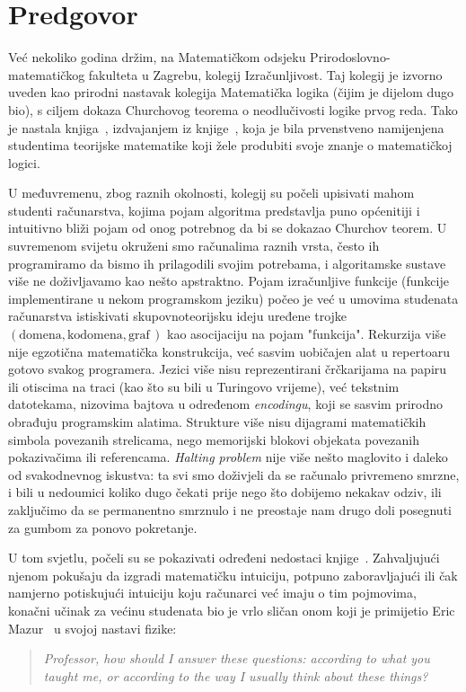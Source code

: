 \chapter{Predgovor}


Već nekoliko godina držim, na Matematičkom odsjeku Prirodoslovno-matematičkog fakulteta u Zagrebu, kolegij Izračunljivost. Taj kolegij je izvorno uveden kao prirodni nastavak kolegija Matematička logika (čijim je dijelom dugo bio), s ciljem dokaza Churchovog teorema o neodlučivosti logike prvog reda. Tako je nastala knjiga~\cite{skr:Vuk}, izdvajanjem iz knjige~\cite{skr:VukML}, koja je bila prvenstveno namijenjena studentima teorijske matematike koji žele produbiti svoje znanje o matematičkoj logici.

U međuvremenu, zbog raznih okolnosti, kolegij su počeli upisivati mahom studenti računarstva, kojima pojam algoritma predstavlja puno općenitiji i intuitivno bliži pojam od onog potrebnog da bi se dokazao Churchov teorem. U suvremenom svijetu okruženi smo računalima raznih vrsta, često ih programiramo da bismo ih prilagodili svojim potrebama, i algoritamske sustave više ne doživljavamo kao nešto apstraktno. Pojam izračunljive funkcije (funkcije implementirane u nekom programskom jeziku) počeo je već u umovima studenata računarstva istiskivati skupovnoteorijsku ideju uređene trojke $(\text{domena},\text{kodomena},\text{graf}\,)$ kao asocijaciju na pojam "funkcija". Rekurzija više nije egzotična matematička konstrukcija, već sasvim uobičajen alat u repertoaru gotovo svakog programera. Jezici više nisu reprezentirani črčkarijama na papiru ili otiscima na traci (kao što su bili u Turingovo vrijeme), već tekstnim datotekama, nizovima bajtova u određenom \emph{encodingu}, koji se sasvim prirodno obrađuju programskim alatima. Strukture više nisu dijagrami matematičkih simbola povezanih strelicama, nego memorijski blokovi objekata povezanih pokazivačima ili referencama. \emph{Halting problem} nije više nešto maglovito i daleko od svakodnevnog iskustva: ta svi smo doživjeli da se računalo privremeno smrzne, i bili u nedoumici koliko dugo čekati prije nego što dobijemo nekakav odziv, ili zaključimo da se permanentno smrznulo i ne preostaje nam drugo doli posegnuti za gumbom za ponovo pokretanje. 

U tom svjetlu, počeli su se pokazivati određeni nedostaci knjige~\cite{skr:Vuk}. Zahvaljujući njenom pokušaju da izgradi matematičku intuiciju, potpuno zaboravljajući ili čak namjerno potiskujući intuiciju koju računarci već imaju o tim pojmovima, konačni učinak za većinu studenata bio je vrlo sličan onom koji je primijetio Eric Mazur~\cite{mazur} u svojoj nastavi fizike:
\begin{quote}
    \emph{Professor, how should I answer these questions: according to what you taught me, or according to the way I usually think about these things?}
\end{quote}

